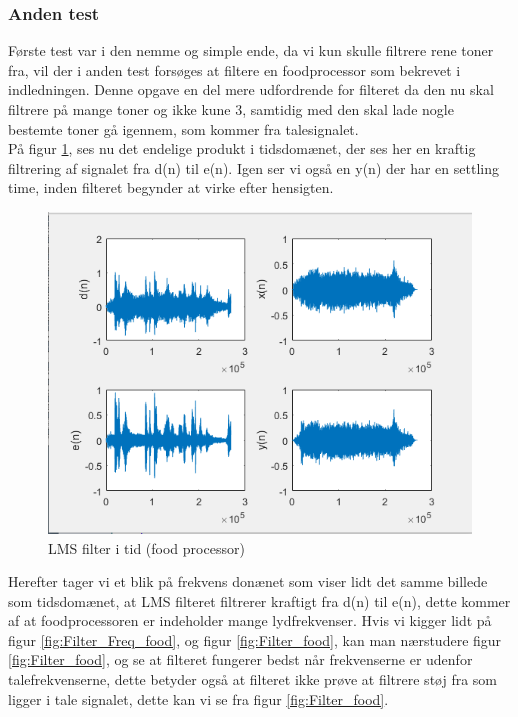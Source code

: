 \subsubsection{Anden test}
Første test var i den nemme og simple ende, da vi kun skulle filtrere rene toner fra, vil der i anden test forsøges at filtere en foodprocessor som bekrevet i indledningen. Denne opgave en del mere udfordrende for filteret da den nu skal filtrere på mange toner og ikke kune 3, samtidig med den skal lade nogle bestemte toner gå igennem, som kommer fra talesignalet. \\
På figur \ref{fig:Filter_time_food}, ses nu det endelige produkt i tidsdomænet, der ses her en kraftig filtrering af signalet fra d(n) til e(n). Igen ser vi også en y(n) der har en settling time, inden filteret begynder at virke efter hensigten. 

\begin{figure}[H]
	\centering
	\includegraphics[width = 400pt]{Img/Filter_time_food}
	\caption{LMS filter i tid (food processor)}
	\label{fig:Filter_time_food}
\end{figure}
\newpage

Herefter tager vi et blik på frekvens donænet som viser lidt det samme billede som tidsdomænet, at LMS filteret filtrerer kraftigt fra d(n) til e(n), dette kommer af at foodprocessoren er indeholder mange lydfrekvenser. Hvis vi kigger lidt på figur \ref{fig:Filter_Freq_food}, og figur \ref{fig:Filter_food}, kan man nærstudere figur \ref{fig:Filter_food}, og se at filteret fungerer bedst når frekvenserne er udenfor talefrekvenserne, dette betyder også at filteret ikke prøve at filtrere støj fra som ligger i tale signalet, dette kan vi se fra figur \ref{fig:Filter_food}.

